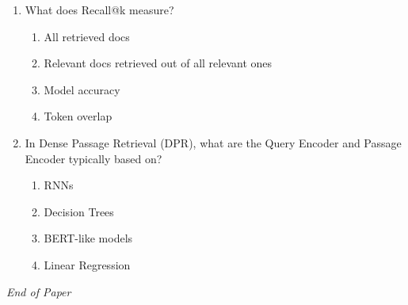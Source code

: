 \documentclass[12pt]{article}
\begin{document}
\begin{enumerate}[label=Q\arabic*.]
\begin{enumerate}[label=(\Alph*)]
    \item Backpropagates through retrieval to update encoders
    \item Byte-pair encoding to compress queries
    \item Learned neural embeddings for queries and documents
    \item Document-length normalization and tunable term saturation on term frequency
\end{enumerate}
\item What does Recall@k measure?
\begin{enumerate}[label=(\Alph*)]
    \item All retrieved docs
    \item Relevant docs retrieved out of all relevant ones
    \item Model accuracy
    \item Token overlap
\end{enumerate}
\item In Dense Passage Retrieval (DPR), what are the Query Encoder and Passage Encoder typically based on?
\begin{enumerate}[label=(\Alph*)]
    \item RNNs
    \item Decision Trees
    \item BERT-like models
    \item Linear Regression
\end{enumerate}
\end{enumerate}

\vfill
\noindent\textit{End of Paper}
\end{document}
